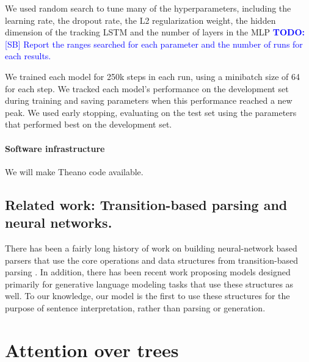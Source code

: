 \documentclass[11pt,letterpaper]{article}
\newcommand\todo[1]{\textcolor{blue}{\textbf{TODO:} #1}}
\begin{document}
We used random search to tune many of the hyperparameters, including the learning rate, the dropout rate, the L2 regularization weight, the hidden dimension of the tracking LSTM and the number of layers in the MLP \todo{[SB] Report the ranges searched for each parameter and the number of runs for each results.}

We trained each model for 250k steps in each run, using a minibatch size of 64 for each step. We tracked each model's performance on the development set during training and saving parameters when this performance reached a new peak. We used early stopping, evaluating on the test set using the parameters that performed best on the development set.

\paragraph{Software infrastructure} We will make Theano code available.

\subsection{Related work: Transition-based parsing and neural networks.}

There has been a fairly long history of work on building neural-network based parsers that use the core operations and data structures from transition-based parsing \cite{henderson2004discriminative,emami2005neural,titov2010latent,buys2generative,chen2014,dyer-EtAl:2015:ACL-IJCNLP}. In addition, there has been recent work \cite{zhang2016top,dyer2016rnn} proposing models designed primarily for generative language modeling tasks that use these structures as well. To our knowledge, our model is the first to use these structures for the purpose of sentence interpretation, rather than parsing or generation.

\section{Attention over trees}


\end{document}
